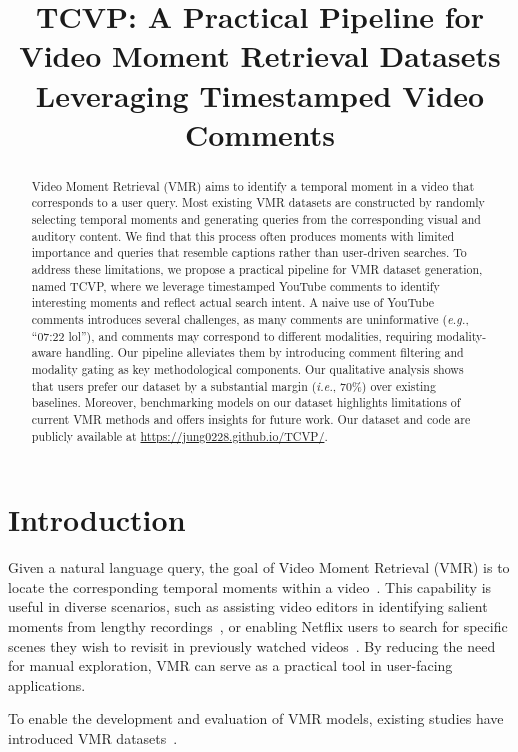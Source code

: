 \documentclass[11pt]{article}
\title{TCVP: A Practical Pipeline for Video Moment Retrieval Datasets \\Leveraging Timestamped Video Comments}
\newcommand{\eg}{\emph{e.g.}}
\newcommand{\ie}{\emph{i.e.}}
\begin{document}
\maketitle
\begin{abstract} 
Video Moment Retrieval (VMR) aims to identify a temporal moment in a video that corresponds to a user query.
Most existing VMR datasets are constructed by randomly selecting temporal moments and generating queries from the corresponding visual and auditory content. 
We find that this process often produces moments with limited importance and queries that resemble captions rather than user-driven searches.
To address these limitations, we propose a practical pipeline for VMR dataset generation, named TCVP, where we leverage timestamped YouTube comments to identify interesting moments and reflect actual search intent.
A naive use of YouTube comments introduces several challenges, as many comments are uninformative (\eg, “07:22 lol”), and comments may correspond to different modalities, requiring modality-aware handling.
Our pipeline alleviates them by introducing comment filtering and modality gating as key methodological components.
Our qualitative analysis shows that users prefer our dataset by a substantial margin (\ie, 70\%) over existing baselines. 
Moreover, benchmarking models on our dataset highlights limitations of current VMR methods and offers insights for future work.
Our dataset and code are publicly available at \url{https://jung0228.github.io/TCVP/}. 
\end{abstract}


\vspace{+1em}
\section{Introduction}
Given a natural language query, the goal of Video Moment Retrieval (VMR) is to locate the corresponding temporal moments within a video~\cite{lei2021detecting, moon2023query, ren2024timechat, pan2025timesearch}.
This capability is useful in diverse scenarios, such as assisting video editors in identifying salient moments from lengthy recordings~\cite{huh2025videodiff, croitoru2023moment}, or enabling Netflix users to search for specific scenes they wish to revisit in previously watched videos~\cite{chen2023invideosearch}.
By reducing the need for manual exploration, VMR can serve as a practical tool in user-facing applications.

To enable the development and evaluation of VMR models, existing studies have introduced VMR datasets~\cite{gao2017tall,lei2020tvr,lei2021detecting,lin2023univtg, soldan2022mad}. 
\end{document}
